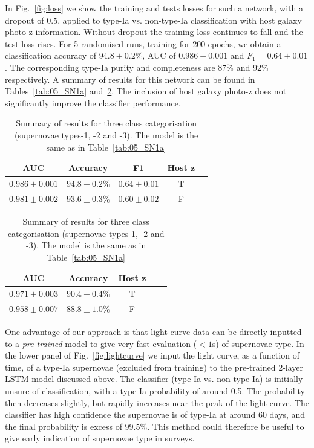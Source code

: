 \documentclass[twocolumn]{aastex61}
\begin{document}
In Fig.~\ref{fig:loss} we show the training and tests losses for such a network, with a dropout of $0.5$, applied to type-Ia vs. non-type-Ia classification with host galaxy photo-z information. Without dropout the training loss continues to fall and the test loss rises. For 5 randomised runs, training for 200 epochs, we obtain a classification accuracy of $94.8 \pm 0.2$\%, AUC of $0.986 \pm 0.001$ and $F_1 = 0.64 \pm 0.01$. The corresponding type-Ia purity and completeness are 87\% and 92\% respectively. A summary of results for this network can be found in Tables~\ref{tab:05_SN1a} and~\ref{tab:05_123}. The inclusion of host galaxy photo-z does not significantly improve the classifier performance.  

\begin{table}[t!]
\begin{subtable}
\centering
\begin{tabular}{|c | c | c | c | c |} \hline 
AUC & Accuracy & F1 & Host z \\ \hline 
$ 0.986 \pm  0.001$ &  $  94.8 \pm 0.2\% $ & $  0.64 \pm 0.01  $ & T  \\
$ 0.981 \pm  0.002$ &  $  93.6 \pm 0.3\% $ & $  0.60 \pm 0.02  $ & F  \\ \hline
\end{tabular}
\caption{\label{tab:05_SN1a} Summary of results for  type-Ia vs. non-type-Ia classification with a training fraction of 0.5. The network is a 2-layer LSTM, each with 16 hidden units and dropout of 0.5.}
\end{subtable}%
\begin{subtable}
\centering
\begin{tabular}{|c | c | c | c | c |} \hline 
AUC & Accuracy & Host z  \\ \hline 
$ 0.971  \pm 0.003 $ &  $  90.4  \pm 0.4 \% $ & T  \\
$ 0.958 \pm  0.007 $ &  $   88.8 \pm 1.0 \% $ & F \\ \hline
\end{tabular}
\caption{\label{tab:05_123} Summary of results for three class categorisation (supernovae types-1, -2 and -3). The model is the same as in Table~\ref{tab:05_SN1a}}
\end{subtable}
\end{table}

One advantage of our approach is that light curve data can be directly inputted to a {\em pre-trained} model to give very fast evaluation ($<1$s) of supernovae type. In the lower panel of Fig.~\ref{fig:lightcurve} we input the light curve, as a function of time, of a type-Ia supernovae (excluded from training) to the pre-trained 2-layer LSTM model discussed above. The classifier (type-Ia vs. non-type-Ia) is initially unsure of classification, with a type-Ia probability of around 0.5. The probability then decreases slightly, but rapidly increases near the peak of the light curve. The classifier has high confidence the supernovae is of type-Ia at around 60 days, and the final probability is excess of $99.5\%$.  This method could therefore be useful to give early indication of supernovae type in surveys.
\end{document}
